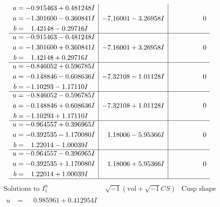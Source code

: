 \documentclass[1p]{elsarticle_modified}
\theoremstyle{definition}
\newcommand{\I}{\sqrt{-1}}
\begin{document}
$$\begin{array}{c|c|c}
\begin{aligned}
u &= -0.915463 + 0.481248 I \\
a &= -1.301600 - 0.360841 I \\
b &= \phantom{-}1.42148 - 0.29716 I\end{aligned}
 & -7.16001 - 3.26958 I & \phantom{-0.000000 } 0 \\ \hline\begin{aligned}
u &= -0.915463 - 0.481248 I \\
a &= -1.301600 + 0.360841 I \\
b &= \phantom{-}1.42148 + 0.29716 I\end{aligned}
 & -7.16001 + 3.26958 I & \phantom{-0.000000 } 0 \\ \hline\begin{aligned}
u &= -0.846052 + 0.596785 I \\
a &= -0.148846 - 0.608636 I \\
b &= -1.10293 - 1.17110 I\end{aligned}
 & -7.32108 - 1.01128 I & \phantom{-0.000000 } 0 \\ \hline\begin{aligned}
u &= -0.846052 - 0.596785 I \\
a &= -0.148846 + 0.608636 I \\
b &= -1.10293 + 1.17110 I\end{aligned}
 & -7.32108 + 1.01128 I & \phantom{-0.000000 } 0 \\ \hline\begin{aligned}
u &= -0.964557 + 0.396965 I \\
a &= -0.392535 - 1.170080 I \\
b &= \phantom{-}1.22014 - 1.00039 I\end{aligned}
 & \phantom{-}1.18006 - 5.95366 I & \phantom{-0.000000 } 0 \\ \hline\begin{aligned}
u &= -0.964557 - 0.396965 I \\
a &= -0.392535 + 1.170080 I \\
b &= \phantom{-}1.22014 + 1.00039 I\end{aligned}
 & \phantom{-}1.18006 + 5.95366 I & \phantom{-0.000000 } 0\\
 \hline 
 \end{array}$$\newpage$$\begin{array}{c|c|c}  
\text{Solutions to }I^u_{1}& \I (\text{vol} + \sqrt{-1}CS) & \text{Cusp shape}\\
 \hline 
\begin{aligned}
u &= \phantom{-}0.985961 + 0.412954 I \\

\end{aligned}
\end{array}$$
\end{document}

